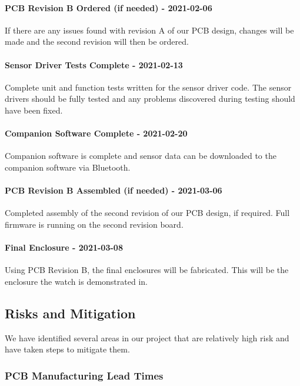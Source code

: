 \paragraph{PCB Revision B Ordered (if needed) - 2021-02-06}
If there are any issues found with revision A of our PCB design, changes will
be made and the second revision will then be ordered.

\paragraph{Sensor Driver Tests Complete - 2021-02-13}
Complete unit and function tests written for the sensor driver code.  The sensor
drivers should be fully tested and any problems discovered during testing
should have been fixed.

\paragraph{Companion Software Complete - 2021-02-20}
Companion software is complete and sensor data can be downloaded to the 
companion software via Bluetooth.

\paragraph{PCB Revision B Assembled (if needed) - 2021-03-06}
Completed assembly of the second revision of our PCB design, if required.
Full firmware is running on the second revision board.

\paragraph{Final Enclosure - 2021-03-08}
Using PCB Revision B, the final enclosures will be fabricated.  This will be the
enclosure the watch is demonstrated in.


\subsection{Risks and Mitigation}

We have identified several areas in our project that are relatively high risk and
have taken steps to mitigate them.

\subsubsection{PCB Manufacturing Lead Times}

